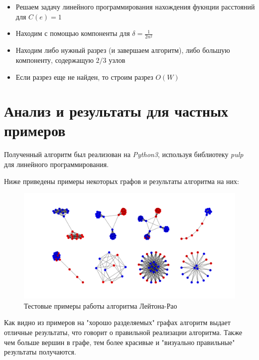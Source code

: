 \documentclass[12pt]{article} %
\begin{document}
\begin{itemize}
\item 
    Решаем задачу линейного программирования нахождения фукнции расстояний для $C(e) = 1$
\item
    Находим с помощью компоненты для $\delta = \frac{1}{2n^2}$
\item
    Находим либо нужный разрез (и завершаем алгоритм), либо большую компоненту, содержащую $2/3$ узлов
\item
    Если разрез еще не найден, то строим разрез $O(W)$
\end{itemize}

\newpage

\section{Анализ и результаты для частных примеров}

Полученный алгоритм был реализован на \emph{Python3}, используя библиотеку \emph{pulp} для линейного программирования.

Ниже приведены примеры некоторых графов и результаты алгоритма на них:

\begin{figure}[h!]
    \centering
    \includegraphics[width=180mm]{test.png}
    \caption{Тестовые примеры работы алгоритма Лейтона-Рао}
    \label{FigExample}
\end{figure}

Как видно из примеров на "хорошо разделяемых" графах алгоритм выдает отличные результаты, что говорит о правильной реализации алгоритма. Также чем больше вершин в графе, тем более красивые и "визуально правильные" результаты получаются.

\newpage
\end{document}
